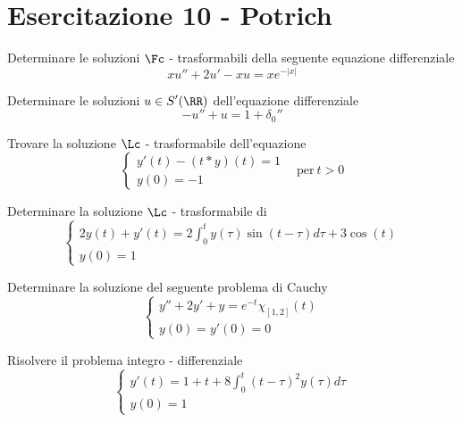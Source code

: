 \chapter{Esercitazione 10 - Potrich}

\ParteEsercizi

\Esercizio{}

Determinare le soluzioni $\displaystyle \Fc $ - trasformabili della seguente equazione differenziale
\begin{equation*}
xu'' + 2u' - xu = xe^{- | x|}
\end{equation*}

\Esercizio{}

Determinare le soluzioni $\displaystyle u\in S'(\RR)$ dell'equazione differenziale
\begin{equation*}
- u'' + u = 1 + \delta_{0}''
\end{equation*}

\Esercizio{}

Trovare la soluzione $\Lc$ - trasformabile dell'equazione
\begin{equation*}
\begin{cases}
y'(t) - (t*y)(t) = 1\\
y(0) = - 1
\end{cases} \ \ \ \ \text{per} \ t > 0
\end{equation*}

\Esercizio{}

Determinare la soluzione $\Lc$ - trasformabile di
\begin{equation*}
\begin{cases}
2y(t) + y'(t) = 2\int^{t}_{0} y(\tau)\sin(t - \tau) d\tau + 3\cos(t)\\
y(0) = 1
\end{cases}
\end{equation*}

\Esercizio{}

Determinare la soluzione del seguente problema di Cauchy
\begin{equation*}
\begin{cases}
y'' + 2y' + y = e^{- t} \chi_{[ 1, 2]}(t)\\
y(0) = y'(0) = 0
\end{cases}
\end{equation*}

\Esercizio{}

Risolvere il problema integro - differenziale
\begin{equation*}
\begin{cases}
y'(t) = 1 + t + 8\int^{t}_{0}(t - \tau)^{2} y(\tau) d\tau \\
y(0) = 1
\end{cases}
\end{equation*}

